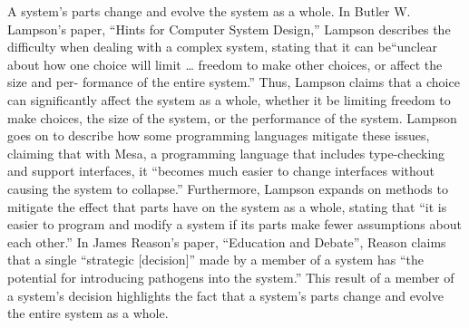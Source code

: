 \documentclass[11pt]{article}
\begin{document}
\par A system’s parts change and evolve the system as a whole. In Butler W. Lampson’s paper, ``Hints for Computer System Design,'' Lampson describes the difficulty when dealing with a complex system, stating that it can be``unclear about how one choice will limit … freedom to make other choices, or affect the size and per- formance of the entire system.''\cite{lampson:1983} Thus, Lampson claims that a choice can significantly affect the system as a whole, whether it be limiting freedom to make choices, the size of the system, or the performance of the system. Lampson goes on to describe how some programming languages mitigate these issues, claiming that with Mesa, a programming language that includes type-checking and support interfaces, it ``becomes much easier to change interfaces without causing the system to collapse.'' \cite{lampson:1983}Furthermore, Lampson expands on methods to mitigate the effect that parts have on the system as a whole, stating that ``it is easier to program and modify a system if its parts make fewer assumptions about each other.''\cite{lampson:1983} In James  Reason’s paper, ``Education and Debate'', Reason claims that a single ``strategic [decision]'' made by a member of a system has ``the potential   for   introducing   pathogens   into   the system.''\cite{reason:2000} This result of a member of a system’s decision highlights the fact that a system’s parts change and evolve the entire system as a whole. 
\end{document}
